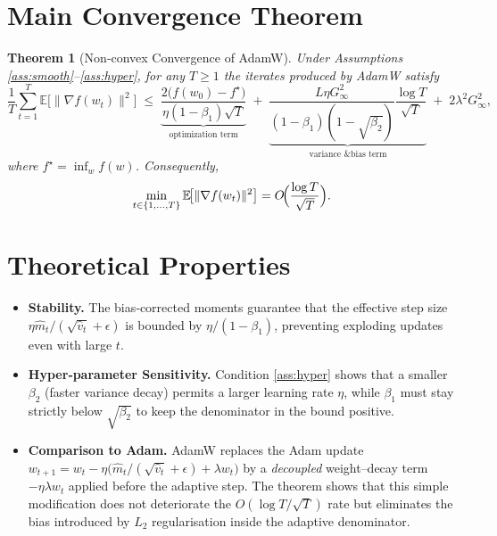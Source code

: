 \documentclass[11pt]{article}
\newtheorem{theorem}{Theorem}
\newcommand{\E}{\mathbb{E}}
\begin{document}
\section*{Main Convergence Theorem}
\begin{theorem}[Non‑convex Convergence of AdamW]\label{thm:main}
Under Assumptions \ref{ass:smooth}–\ref{ass:hyper}, for any $T\ge1$ the iterates produced by AdamW satisfy
\[
\frac{1}{T}\sum_{t=1}^{T}\E\!\bigl[\|\nabla f(w_{t})\|^{2}\bigr]
\;\le\;
\underbrace{\frac{2\bigl(f(w_{0})-f^{\star}\bigr)}{\eta(1-\beta_{1})\sqrt{T}}}_{\text{optimization term}}
\;+\;
\underbrace{\frac{L\eta G_{\infty}^{2}}{(1-\beta_{1})(1-\sqrt{\beta_{2}})}\frac{\log T}{\sqrt{T}}}_{\text{variance \& bias term}}
\;+\;
2\lambda^{2}G_{\infty}^{2},
\]
where $f^{\star}=\inf_{w}f(w)$. Consequently,
\[
\min_{t\in\{1,\dots,T\}}\E\!\bigl[\|\nabla f(w_{t})\|^{2}\bigr]
=O\!\Bigl(\frac{\log T}{\sqrt{T}}\Bigr).
\]
\end{theorem}

\section*{Theoretical Properties}
\begin{itemize}
\item \textbf{Stability.} The bias‑corrected moments guarantee that the effective step size
$\eta\hat m_{t}/(\sqrt{\hat v_{t}}+\epsilon)$ is bounded by $\eta/(1-\beta_{1})$,
preventing exploding updates even with large $t$.
\item \textbf{Hyper‑parameter Sensitivity.}
Condition \eqref{ass:hyper} shows that a smaller $\beta_{2}$ (faster variance decay) permits a larger learning rate $\eta$, while $\beta_{1}$ must stay strictly below $\sqrt{\beta_{2}}$ to keep the denominator in the bound positive.
\item \textbf{Comparison to Adam.}
AdamW replaces the Adam update $w_{t+1}=w_{t}-\eta\bigl(\hat m_{t}/(\sqrt{\hat v_{t}}+\epsilon)+\lambda w_{t}\bigr)$
by a \emph{decoupled} weight–decay term $-\eta\lambda w_{t}$ applied before the adaptive step.
The theorem shows that this simple modification does not deteriorate the $O(\log T/\sqrt{T})$ rate
but eliminates the bias introduced by $L_{2}$ regularisation inside the adaptive denominator.
\end{itemize}
\end{document}
